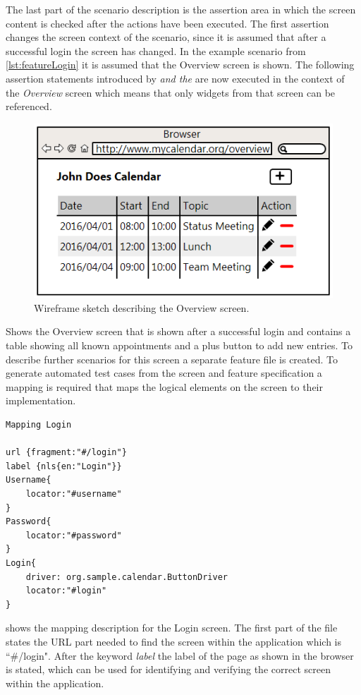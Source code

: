 \documentclass{sig-alternate-05-2015}
\begin{document}
The last part of the scenario description is the assertion area in which the screen content is checked after the actions have been executed.
The first assertion changes the screen context of the scenario, since it is assumed that after a successful login the screen has changed.
In the example scenario from \cref{lst:featureLogin} it is assumed that the Overview screen is shown.
The following assertion statements introduced by \textit{and the} are now executed in the context of the \textit{Overview} screen which means that only widgets from that screen can be referenced.
\begin{figure}[h]
	\centering
	\includegraphics[width=0.8\linewidth]{Overview.png}
	\caption{Wireframe sketch describing the Overview screen.}
	\label{fig:overview}
\end{figure}

 Shows the Overview screen that is shown after a successful login and contains a table showing all known appointments and a plus button to add new entries.
To describe further scenarios for this screen a separate feature file is created.
To generate automated test cases from the screen and feature specification a mapping is required that maps the logical elements on the screen to their implementation.

\begin{lstlisting}[captionpos=b, caption=Mapping Description: Login Screen., label={lst:mappinglogin}, language=dsl]
Mapping Login

url {fragment:"#/login"}
label {nls{en:"Login"}}
Username{
	locator:"#username"
}
Password{
	locator:"#password"
}
Login{ 
    driver: org.sample.calendar.ButtonDriver
    locator:"#login"
}
\end{lstlisting}

 shows the mapping description for the Login screen.
The first part of the file states the URL part needed to find the screen within the application which is ``\#/login". 
After the keyword \textit{label} the label of the page as shown in the browser is stated, which can be used for identifying and verifying the correct screen within the application.
\end{document}
